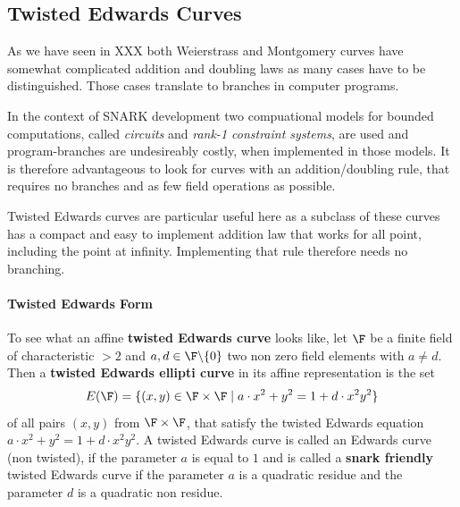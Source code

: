 
\subsection{Twisted Edwards Curves}
As we have seen in XXX both Weierstrass and Montgomery curves have somewhat complicated addition and doubling laws as many cases have to be distinguished. Those cases translate to branches in computer programs.

In the context of SNARK development two compuational models for bounded computations, called \textit{circuits} and \textit{rank-1 constraint systems}, are used and program-branches are undesireably costly, when implemented in those models. It is therefore advantageous to look for curves with an addition/doubling rule, that requires no branches and as few field operations as possible.

Twisted Edwards curves are particular useful here as a subclass of these curves has a compact and easy to implement addition law that works for all point, including the point at infinity. Implementing that rule therefore needs no branching. 
\paragraph{Twisted Edwards Form}
To see what an affine \textbf{twisted Edwards curve} looks like, let $\F$ be a finite field of characteristic $>2$ and $a,d\in \F\backslash\{0\}$ two non zero field elements with $a\neq d$. Then a \textbf{twisted Edwards ellipti curve} in its affine representation is the set
\begin{equation}
E(\F)=\{(x,y)\in\F\times\F\;|\; a\cdot x^2+y^2= 1+d\cdot x^2y^2\}
\end{equation} 
of all pairs $(x,y)$ from $\F\times \F$, that satisfy the twisted Edwards equation $a\cdot x^2+y^2= 1+d\cdot x^2y^2$. A twisted Edwards curve is called an Edwards curve (non twisted), if the parameter $a$ is equal to $1$ and is called a \textbf{snark friendly} twisted Edwards curve if the parameter $a$ is a quadratic residue and the parameter $d$ is a quadratic non residue.

